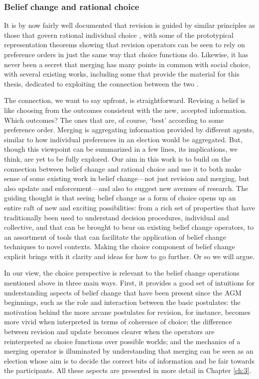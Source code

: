 \subsubsection{Belief change and rational choice}
It is by now fairly well documented that
revision is guided by similar principles 
as those that govern rational individual choice
\cite{Doyle91,Rott92,Bonanno09,Arlo-CostaP10,MaLD15},
with some of the prototypical representation theorems
\cite{GardenforsM88,Grove88,KatsunoM92}
showing that revision operators
can be seen to rely on preference orders 
in just the same way that choice functions do.
Likewise, it has never been a secret that 
merging has many points in common with social choice,
with several existing works,
including some that provide the material for this thesis,
dedicated to exploiting the connection between the two
\cite{EckertP05,EveraereKM07,GabbayPR07,EveraereKM14,LangX16,HaretPW16,HaretW19b,HaretLPW20}.

The connection, we want to say upfront, is straightforward.
Revising a belief is like choosing
from the outcomes consistent with
the new, accepted information.
Which outcomes? The ones that are, 
of course, `best' according to 
some preference order.
Merging is aggregating 
information provided by different 
agents, similar to how individual preferences 
in an election would be aggregated.
But, though this viewpoint can be summarized in a few
lines, its implications, we think,
are yet to be fully explored.
Our aim in this work is to build on the connection
between belief change and rational choice and use it 
to both make sense of some existing work in
belief change---not just revision and merging,
but also update and enforcement---and also to 
suggest new avenues of research.
The guiding thought is that seeing belief change 
as a form of choice opens up
an entire raft of new and exciting possibilities:
from a rich set of properties that have traditionally been used to 
understand decision procedures, individual and collective, 
and that can be brought to bear on existing belief change operators,
to an assortment of tools that can facilitate the application of 
belief change techniques to novel contexts. 
Making the choice component of belief change
explicit brings with it clarity and ideas for how to 
go further.
Or so we will argue. 

In our view, the choice perspective
is relevant to the belief change operations
mentioned above in three main ways.
First, it provides a good set of intuitions 
for understanding aspects of belief change
that have been present since the AGM beginnings, 
such as the role and interaction between the basic postulates:
the motivation behind the more arcane postulates for revision,
for instance, becomes more vivid when interpreted in terms of coherence of choice;
the difference between revision and update becomes clearer
when the operators are reinterpreted as choice functions over possible worlds;
and the mechanics of a merging operator is illuminated by understanding 
that merging can be seen as an election 
whose aim is to decide the correct bits of information
and be fair towards the participants.
All these aspects are presented in more detail in Chapter \ref{ch:3}.

